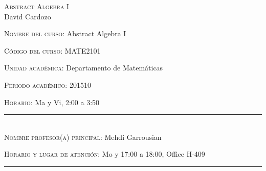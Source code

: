 \begin{center}
\textsc{\large Abstract Algebra I }\\[0.1cm]
\large David Cardozo\\[0.5cm]
\end{center}	

\large \noindent\textsc{Nombre del curso:}  Abstract Algebra I%

\noindent\textsc{Código del curso:} MATE2101 %

\noindent\textsc{Unidad académica:} Departamento de Matemáticas

\noindent\textsc{Periodo acad\'emico:} 201510 %

\noindent\textsc{Horario:} Ma y Vi, 2:00 a 3:50%

\noindent\rule{\textwidth}{1pt}\\[-0.3cm]

\normalsize \noindent\textsc{Nombre profesor(a) principal:} Mehdi  Garrousian %


\noindent\textsc{Horario y lugar de atenci\'on:} Mo y  17:00 a
18:00, Office H-409

\noindent\rule{\textwidth}{1pt}\\[-0.1cm]